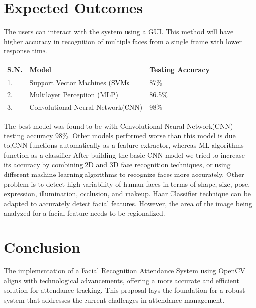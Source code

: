 \section{Expected Outcomes}
The users can interact with the
system using a GUI. This method will
have higher accuracy in recognition of multiple faces from
a single frame with lower response time.

\begin{center}
    \begin{tabular}{|p{1cm}|p{3cm}|p{4cm}| }
        \hline
        S.N. & Model  & Testing Accuracy \\
        \hline
        1. & Support Vector Machines (SVMs & 87\% \\
        \hline
        2. & Multilayer Perception (MLP)  & 86.5\%  \\
        \hline
        3. & Convolutional Neural Network(CNN) & 98\%  \\
        \hline
      
    \end{tabular}
\end{center}
   	The best model was found to be with Convolutional Neural Network(CNN) testing accuracy 98\%. Other models performed worse than this model is due to,CNN functions automatically as a feature extractor, whereas ML algorithms function as a classifier After building the basic CNN model we tried to increase its accuracy by  combining 2D and 3D face recognition techniques, or using different machine learning algorithms to recognize faces more accurately.  
 Other problem is to detect high variability of human faces in terms of shape, size, pose, expression, illumination, occlusion, and makeup.
Haar Classifier technique can be adapted to accurately detect facial features. However, the area of the image being analyzed for a facial feature needs to be regionalized.


\section{Conclusion}
The implementation of a Facial Recognition Attendance System using OpenCV aligns with technological advancements, offering a more accurate and efficient solution for attendance tracking. This proposal lays the foundation for a robust system that addresses the current challenges in attendance management.

